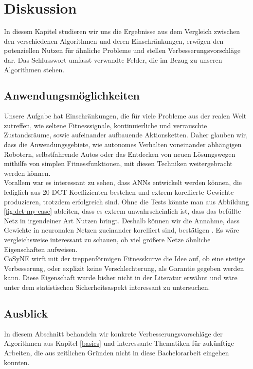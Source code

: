 \chapter{Diskussion}
    In diesem Kapitel studieren wir uns die Ergebnisse aus dem Vergleich zwischen den verschiedenen Algorithmen und deren Einschränkungen, erwägen den potenziellen Nutzen für ähnliche Probleme und stellen Verbesserungsvorschläge dar. Das Schlusswort umfasst verwandte Felder, die im Bezug zu unseren Algorithmen stehen.
    \section{Anwendungsmöglichkeiten}
        Unsere Aufgabe hat Einschränkungen, die für viele Probleme aus der realen Welt zutreffen, wie seltene Fitnesssignale, kontinuierliche und verrauschte Zustandsräume, sowie aufeinander aufbauende Aktionsketten. Daher glauben wir, dass die Anwendungsgebiete, wie autonomes Verhalten voneinander abhängigen Robotern, selbstfahrende Autos oder das Entdecken von neuen Lösungswegen mithilfe von simplen Fitnessfunktionen, mit diesen Techniken weitergebracht werden können. \\

        \noindent
        Vorallem war es interessant zu sehen, dass ANNs entwickelt werden können, die lediglich aus 20 DCT Koeffizienten bestehen und extrem korellierte Gewichte produzieren, trotzdem erfolgreich sind. Ohne die Tests könnte man aus Abbildung \ref{fig:dct-my-case} ableiten, dass es extrem unwahrscheinlich ist, dass das befüllte Netz in irgendeiner Art Nutzen bringt. Deshalb können wir die Annahme, dass Gewichte in neuronalen Netzen zueinander korelliert sind, bestätigen \cite{cosyne1}. Es wäre vergleichsweise interessant zu schauen, ob viel größere Netze ähnliche Eigenschaften aufweisen. \\

        \noindent
        CoSyNE wirft mit der treppenförmigen Fitnesskurve die Idee auf, ob eine stetige Verbesserung, oder explizit keine Verschlechterung, als Garantie gegeben werden kann. Diese Eigenschaft wurde bisher nicht in der Literatur \cite{cosyne1}\cite{cosyne2}\cite{cosyne3} erwähnt und wäre unter dem statistischen Sicherheitsaspekt interessant zu untersuchen.

\newpage

    \section{Ausblick} \label{ausblick}
        In diesem Abschnitt behandeln wir konkrete Verbesserungsvorschläge der Algorithmen aus Kapitel \ref{basics} und interessante Thematiken für zukünftige Arbeiten, die aus zeitlichen Gründen nicht in diese Bachelorarbeit eingehen konnten.

